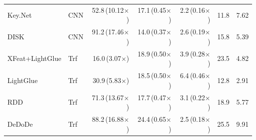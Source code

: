 \begin{table}[H]
\begin{tabular}{@{}llrrrrr@{}}
Key.Net & CNN & 52.8\,(10.12$\times$) & 17.1\,(0.45$\times$) & 2.2\,(0.16$\times$) & 11.8 & 7.62 \\
DISK & CNN & 91.2\,(17.46$\times$) & 14.0\,(0.37$\times$) & 2.6\,(0.19$\times$) & 15.8 & 5.39 \\
XFeat+LightGlue & Trf & 16.0\,(3.07$\times$) & 18.9\,(0.50$\times$) & 3.9\,(0.28$\times$) & 23.5 & 4.82 \\
LightGlue & Trf & 30.9\,(5.83$\times$) & 18.5\,(0.50$\times$) & 6.4\,(0.46$\times$) & 12.8 & 2.91 \\
RDD & Trf & 71.3\,(13.67$\times$) & 17.7\,(0.47$\times$) & 3.1\,(0.22$\times$) & 18.9 & 5.77 \\
DeDoDe & Trf & 88.2\,(16.88$\times$) & 24.4\,(0.65$\times$) & 2.5\,(0.18$\times$) & 25.5 & 9.91 \\
\bottomrule
\end{tabular}
\end{table}
